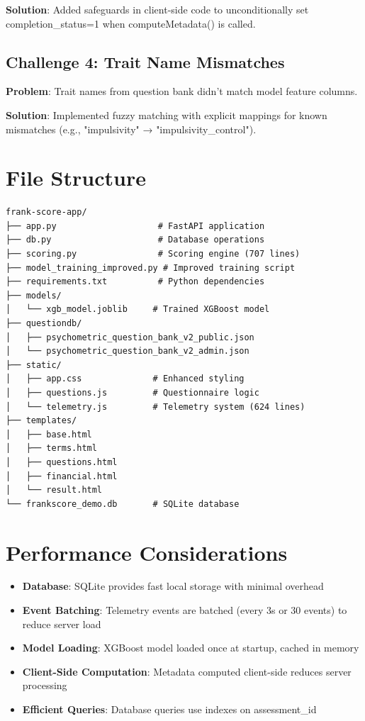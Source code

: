 \documentclass[11pt,a4paper]{article}
\begin{document}
\textbf{Solution}: Added safeguards in client-side code to unconditionally set completion\_status=1 when computeMetadata() is called.

\subsection{Challenge 4: Trait Name Mismatches}
\textbf{Problem}: Trait names from question bank didn't match model feature columns.

\textbf{Solution}: Implemented fuzzy matching with explicit mappings for known mismatches (e.g., "impulsivity" → "impulsivity\_control").

\section{File Structure}

\begin{verbatim}
frank-score-app/
├── app.py                    # FastAPI application
├── db.py                     # Database operations
├── scoring.py                # Scoring engine (707 lines)
├── model_training_improved.py # Improved training script
├── requirements.txt          # Python dependencies
├── models/
│   └── xgb_model.joblib     # Trained XGBoost model
├── questiondb/
│   ├── psychometric_question_bank_v2_public.json
│   └── psychometric_question_bank_v2_admin.json
├── static/
│   ├── app.css              # Enhanced styling
│   ├── questions.js         # Questionnaire logic
│   └── telemetry.js         # Telemetry system (624 lines)
├── templates/
│   ├── base.html
│   ├── terms.html
│   ├── questions.html
│   ├── financial.html
│   └── result.html
└── frankscore_demo.db       # SQLite database
\end{verbatim}

\section{Performance Considerations}

\begin{itemize}
    \item \textbf{Database}: SQLite provides fast local storage with minimal overhead
    \item \textbf{Event Batching}: Telemetry events are batched (every 3s or 30 events) to reduce server load
    \item \textbf{Model Loading}: XGBoost model loaded once at startup, cached in memory
    \item \textbf{Client-Side Computation}: Metadata computed client-side reduces server processing
    \item \textbf{Efficient Queries}: Database queries use indexes on assessment\_id
\end{itemize}
\end{document}
